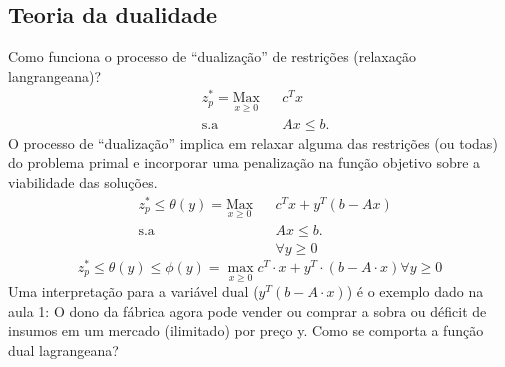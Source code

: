 
\subsection{Teoria da dualidade}

Como funciona o processo de “dualização” de restrições (relaxação langrangeana)?
\begin{equation*}
\begin{aligned}
& z_{p}^{*}=\underset{x\geq0}{\text{Max}}
& & c^{T}x \\
& \text{s.a}
& & Ax \leq b.
\end{aligned}
\end{equation*}
O processo de ``dualização'' implica em relaxar alguma das restrições
(ou todas) do problema primal e incorporar uma penalização na função
objetivo sobre a viabilidade das soluções.
\begin{equation*}
\begin{aligned}
& z_{p}^{*}\leq \theta(y)=\underset{x\geq0}{\text{Max}}
& & c^{T}x+y^{T}(b-Ax)  \\
& \text{s.a}
& & Ax \leq b. \\
& & & \forall  y\geq 0 
\end{aligned}
\end{equation*}
\[
z_{p}^{*}\leq\theta(y)\leq\phi(y)=\max_{x\geq0}c^{T}\cdot x+y^{T}\cdot(b-A\cdot x)\forall y\geq0
\]
Uma interpretação para a variável dual ($y^{T}(b-A\cdot x)$) é o exemplo dado na aula 1: O dono da fábrica agora pode vender ou comprar a sobra ou déficit de insumos em um mercado (ilimitado) por preço y.
Como se comporta a função dual lagrangeana?

